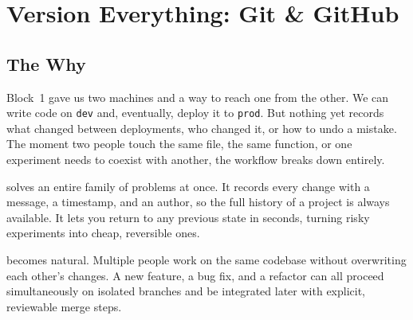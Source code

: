 
\chapter{Version Everything: Git \& GitHub}



\section{The Why}



Block~1 gave us two machines and a way to reach one from the other.
We can write code on \texttt{dev} and, eventually, deploy it to \texttt{prod}.
But nothing yet records what changed between deployments, who changed it, or how to undo a mistake.
The moment two people touch the same file, the same function,
or one experiment needs to coexist with another,
the workflow breaks down entirely.

 solves an entire family of problems at once.
It records every change with a message, a timestamp, and an author,
so the full history of a project is always available.
It lets you return to any previous state in seconds,
turning risky experiments into cheap, reversible ones.

 becomes natural.
Multiple people work on the same codebase without overwriting each other's changes.
A new feature, a bug fix, and a refactor can all proceed simultaneously on isolated branches
and be integrated later with explicit, reviewable merge steps.

